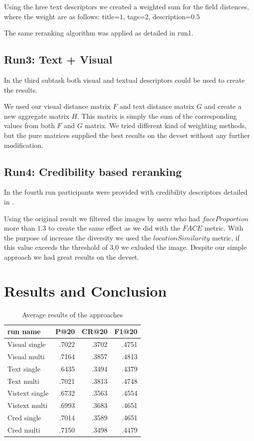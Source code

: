 \documentclass{sig-alternate}
\begin{document}
Using the hree text descriptors we created a weighted sum for the field distences, where the weight are as follows: title=$1$, tags=$2$, description=$0.5$

The same reranking algorithm was applied as detailed in run1.

\subsection{Run3: Text + Visual}
In the third subtask both visual and textual descriptors could be used to create the results.

We used our visual distance matrix $F$ and text distance matrix $G$ and create a new aggregate matrix $H$. This matrix is simply the sum of the corresponding values from both $F$ and $G$ matrix. We tried different kind of weighting methods, but the pure matrices supplied the best results on the devset without any further modification.

\subsection{Run4: Credibility based reranking}
In the fourth run participants were provided with credibility descriptors detailed in \cite{Task2015}.

Using the original result we filtered the images by users who had $faceProportion$ more than $1.3$ to create the same effect as we did with the $FACE$ metric. With the purpose of increase the diversity we used the $locationSimilarity$ metric, if this value exceeds the threshold of $3.0$ we exluded the image. Despite our simple approach we had great results on the devset.

\section{Results and Conclusion}

\begin{table}[h]
	\centering
\begin{tabular}{|l|r|r|r|}
	\hline 
	run name & P@20 & CR@20 & F1@20\tabularnewline
	\hline 
	\hline 
	Visual single & .7022 & .3702 & .4751\tabularnewline
	\hline 
	Visual multi & .7164 & .3857 & .4813\tabularnewline
	\hline 
	Text single & .6435 & .3494 & .4379\tabularnewline
	\hline 
	Text multi & .7021 & .3813 & .4748\tabularnewline
	\hline 
	Vistext single & .6732 & .3563 & .4554\tabularnewline
	\hline 
	Vistext multi & .6993 & .3683 & .4651\tabularnewline
	\hline 
	Cred single & .7014 & .3589 & .4651\tabularnewline
	\hline 
	Cred multi & .7150 & .3498 & .4479\tabularnewline
	\hline 
\end{tabular}
\label{table:results}
\caption{Average results of the approaches}
\end{table}
\end{document}
